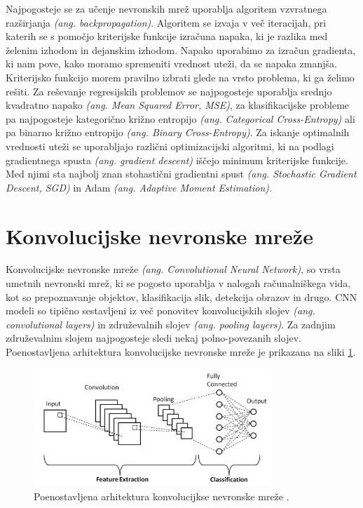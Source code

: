 \documentclass[a4paper,12pt,openright]{book}
\begin{document}
Najpogosteje se za učenje nevronskih mrež uporablja algoritem vzvratnega razširjanja \emph{(ang. backpropagation)}. Algoritem se izvaja v več iteracijah, pri katerih se s pomočjo kriterijske funkcije izračuna napaka, ki je razlika med želenim izhodom in dejanskim izhodom. Napako uporabimo za izračun gradienta, ki nam pove, kako moramo spremeniti vrednost uteži, da se napaka zmanjša. Kriterijsko funkcijo morem pravilno izbrati glede na vrsto problema, ki ga želimo rešiti. Za reševanje regresijskih problemov se najpogosteje uporablja srednjo kvadratno napako \emph{(ang. Mean Squared Error, MSE)}, za klasifikacijske probleme pa najpogosteje kategorično križno entropijo \emph{(ang. Categorical Cross-Entropy)} ali pa binarno križno entropijo \emph{(ang. Binary Cross-Entropy)}. Za iskanje optimalnih vrednosti uteži se uporabljajo različni optimizacijski algoritmi, ki na podlagi gradientnega spusta \emph{(ang. gradient descent)} iščejo minimum kriterijske funkcije. Med njimi sta najbolj znan stohastični gradientni spust \emph{(ang. Stochastic Gradient Descent, SGD)} in Adam \emph{(ang. Adaptive Moment Estimation)}.

\section{Konvolucijske nevronske mreže}
Konvolucijske nevronske mreže \emph{(ang. Convolutional Neural Network)}, so vrsta umetnih nevronski mrež, ki se pogosto uporablja v nalogah računalniškega vida, kot so prepoznavanje objektov, klasifikacija slik, detekcija obrazov in drugo. CNN modeli so tipično sestavljeni iz več ponovitev konvolucijskih slojev \emph{(ang. convolutional layers)} in združevalnih slojev \emph{(ang. pooling layers)}. Za zadnjim združevalnim slojem najpogosteje sledi nekaj polno-povezanih slojev. Poenostavljena arhitektura konvolucijske nevronske mreže je prikazana na sliki \ref{img:cnn}.


\begin{figure}[htb]
    \begin{center}
        \includegraphics[width=0.8\textwidth]{img/cnn.jpg}
    \end{center}
    \caption{Poenostavljena arhitektura konvolucijkse nevronske mreže \cite{cnn}.}
    \label{img:cnn}
\end{figure}
\end{document}
